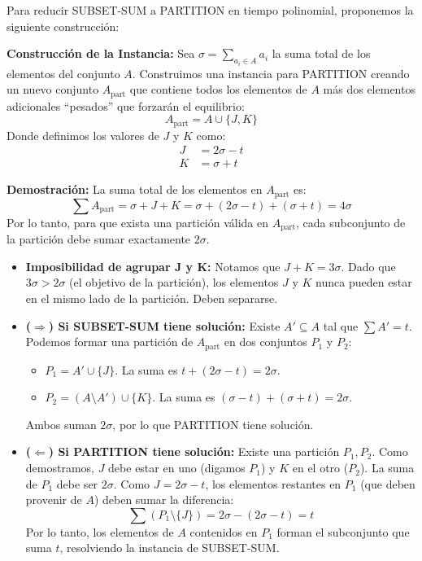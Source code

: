 \documentclass[12pt, a4paper]{article}
\begin{document}
    Para reducir SUBSET-SUM a PARTITION en tiempo polinomial, proponemos la siguiente construcción:

    \textbf{Construcción de la Instancia:}
    Sea $\sigma = \sum_{a_i \in A} a_i$ la suma total de los elementos del conjunto $A$. Construimos una instancia para PARTITION creando un nuevo conjunto $A_{\text{part}}$ que contiene todos los elementos de $A$ más dos elementos adicionales ``pesados'' que forzarán el equilibrio:
    \[
    A_{\text{part}} = A \cup \{ J, K \}
    \]
    Donde definimos los valores de $J$ y $K$ como:
    \begin{align*}
    J &= 2\sigma - t \\
    K &= \sigma + t
    \end{align*}

    \textbf{Demostración:}
    La suma total de los elementos en $A_{\text{part}}$ es:
    \[
    \sum A_{\text{part}} = \sigma + J + K = \sigma + (2\sigma - t) + (\sigma + t) = 4\sigma
    \]
    Por lo tanto, para que exista una partición válida en $A_{\text{part}}$, cada subconjunto de la partición debe sumar exactamente $2\sigma$.

    \begin{itemize}
        \item \textbf{Imposibilidad de agrupar J y K:} Notamos que $J + K = 3\sigma$. Dado que $3\sigma > 2\sigma$ (el objetivo de la partición), los elementos $J$ y $K$ nunca pueden estar en el mismo lado de la partición. Deben separarse.

        \item \textbf{($\Rightarrow$) Si SUBSET-SUM tiene solución:}
        Existe $A' \subseteq A$ tal que $\sum A' = t$.
        Podemos formar una partición de $A_{\text{part}}$ en dos conjuntos $P_1$ y $P_2$:
        \begin{itemize}
            \item $P_1 = A' \cup \{J\}$. La suma es $t + (2\sigma - t) = 2\sigma$.
            \item $P_2 = (A \setminus A') \cup \{K\}$. La suma es $(\sigma - t) + (\sigma + t) = 2\sigma$.
        \end{itemize}
        Ambos suman $2\sigma$, por lo que PARTITION tiene solución.

        \item \textbf{($\Leftarrow$) Si PARTITION tiene solución:}
        Existe una partición $P_1, P_2$. Como demostramos, $J$ debe estar en uno (digamos $P_1$) y $K$ en el otro ($P_2$).
        La suma de $P_1$ debe ser $2\sigma$. Como $J = 2\sigma - t$, los elementos restantes en $P_1$ (que deben provenir de $A$) deben sumar la diferencia:
        \[
        \sum (P_1 \setminus \{J\}) = 2\sigma - (2\sigma - t) = t
        \]
        Por lo tanto, los elementos de $A$ contenidos en $P_1$ forman el subconjunto que suma $t$, resolviendo la instancia de SUBSET-SUM.
    \end{itemize}
\end{document}

